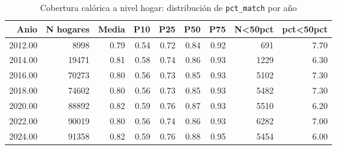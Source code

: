 \begin{table}[ht]
\centering
\caption{Cobertura cal\'orica a nivel hogar: distribuci\'on de \texttt{pct\_match} por a\~{n}o} 
\label{tab:04_pct_match_hogares}
\begin{tabular}{rrrrrrrrr}
  \toprule
Anio & N hogares & Media & P10 & P25 & P50 & P75 & N<50pct & pct<50pct \\ 
  \midrule
2012.00 & 8998 & 0.79 & 0.54 & 0.72 & 0.84 & 0.92 & 691 & 7.70 \\ 
  2014.00 & 19471 & 0.81 & 0.58 & 0.74 & 0.86 & 0.93 & 1229 & 6.30 \\ 
  2016.00 & 70273 & 0.80 & 0.56 & 0.73 & 0.85 & 0.93 & 5102 & 7.30 \\ 
  2018.00 & 74602 & 0.80 & 0.56 & 0.73 & 0.85 & 0.93 & 5482 & 7.30 \\ 
  2020.00 & 88892 & 0.82 & 0.59 & 0.76 & 0.87 & 0.93 & 5510 & 6.20 \\ 
  2022.00 & 90019 & 0.80 & 0.56 & 0.74 & 0.86 & 0.93 & 6282 & 7.00 \\ 
  2024.00 & 91358 & 0.82 & 0.59 & 0.76 & 0.88 & 0.95 & 5454 & 6.00 \\ 
   \bottomrule
\end{tabular}
\end{table}
